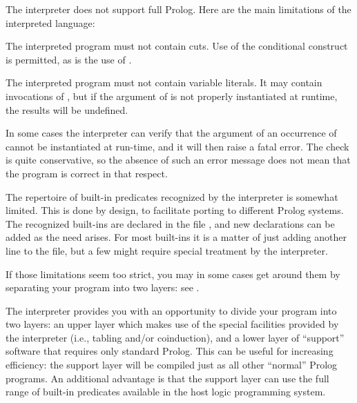 



The interpreter does not support full Prolog.  Here are the main limitations
of the interpreted language:
\begin{Enumerate}

\item
  The interpreted program must not contain cuts.  Use of the
  conditional construct is permitted, as is the
  use of .

\item
  The interpreted program must not contain variable literals.  It may contain
  invocations of , but if the argument of  is
  not properly instantiated at runtime, the results will be undefined.

  In some cases the interpreter can verify that the argument of an occurrence
  of  cannot be instantiated at run-time, and it will then raise
  a fatal error.  The check is quite conservative, so the absence of such an
  error message does not mean that the program is correct in that respect.

\item
  The repertoire of built-in predicates recognized
  by the interpreter is somewhat limited.  This is done by design, to
  facilitate porting to different Prolog systems.  The recognized built-ins
  are declared in the file , and new declarations can be
  added as the need arises.  For most built-ins it is a matter of just adding
  another line to the file, but a few might require special treatment by the
  interpreter.
\end{Enumerate}

If those limitations seem too strict, you may in some cases get around them
by separating your program into two layers: see .



The interpreter provides you with an opportunity to divide your program into
two layers: an upper layer which makes use of the special facilities provided
by the interpreter (i.e., tabling and/or coinduction), and a lower layer of
``support'' software that requires only standard Prolog.  This can be useful
for increasing efficiency: the support layer will be compiled just as all
other ``normal'' Prolog programs.  An additional advantage is that the
support layer can use the full range of built-in predicates available in the
host logic programming system.


